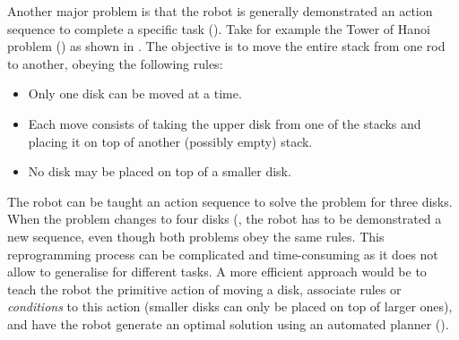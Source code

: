 Another major problem is that the robot is generally demonstrated an action sequence to complete a specific task (\cite{orendt2016robot,peppoloni2014ros}).
Take for example the Tower of Hanoi problem (\cite{douglas1985metamagical}) as shown in .
The objective is to move the entire stack from one rod to another, obeying the following rules:
\begin{itemize}
\item Only one disk can be moved at a time.
\item Each move consists of taking the upper disk from one of the stacks and placing it on top of another (possibly empty) stack.
\item No disk may be placed on top of a smaller disk.
\end{itemize}

The robot can be taught an action sequence to solve the problem for three disks.
When the problem changes to four disks (, the robot has to be demonstrated a new sequence, even though both problems obey the same rules.
This reprogramming process can be complicated and time-consuming as it does not allow to generalise for different tasks.
A more efficient approach would be to teach the robot the primitive action of moving a disk, associate rules or \textit{conditions} to this action (\eg smaller disks can only be placed on top of larger ones), and have the robot generate an optimal solution using an automated planner (\cite{ghallab2004automated}).

